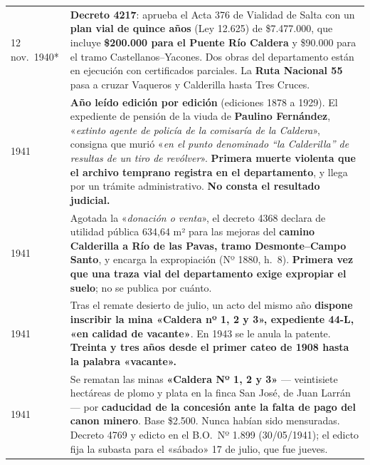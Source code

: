 \begin{longtable}{@{}p{2.7cm}p{10.3cm}@{}}
12 nov.\ 1940* & \textbf{Decreto 4217}: aprueba el Acta 376 de Vialidad de Salta con un \textbf{plan vial de quince años} (Ley 12.625) de \$7.477.000, que incluye \textbf{\$200.000 para el Puente Río Caldera} y \$90.000 para el tramo Castellanos--Yacones. Dos obras del departamento están en ejecución con certificados parciales. La \textbf{Ruta Nacional 55} pasa a cruzar Vaqueros y Calderilla hasta Tres Cruces. \\
1941 & \textbf{Año leído edición por edición} (ediciones 1878 a 1929). El expediente de pensión de la viuda de \textbf{Paulino Fernández}, «\textit{extinto agente de policía de la comisaría de la Caldera}», consigna que murió «\textit{en el punto denominado “la Calderilla” de resultas de un tiro de revólver}». \textbf{Primera muerte violenta que el archivo temprano registra en el departamento}, y llega por un trámite administrativo. \textbf{No consta el resultado judicial.} \\
1941 & Agotada la «\textit{donación o venta}», el decreto 4368 declara de utilidad pública 634,64 m² para las mejoras del \textbf{camino Calderilla a Río de las Pavas, tramo Desmonte--Campo Santo}, y encarga la expropiación (Nº 1880, h.\ 8). \textbf{Primera vez que una traza vial del departamento exige expropiar el suelo}; no se publica por cuánto. \\
1941 & Tras el remate desierto de julio, un acto del mismo año \textbf{dispone inscribir la mina «Caldera nº 1, 2 y 3», expediente 44-L, «en calidad de vacante»}. En 1943 se le anula la patente. \textbf{Treinta y tres años desde el primer cateo de 1908 hasta la palabra «vacante».} \\
1941 & Se rematan las minas \textbf{«Caldera Nº 1, 2 y 3»} --- veintisiete hectáreas de plomo y plata en la finca San José, de Juan Larrán --- por \textbf{caducidad de la concesión ante la falta de pago del canon minero}. Base \$2.500. Nunca habían sido mensuradas. Decreto 4769 y edicto en el B.O.\ Nº 1.899 (30/05/1941); el edicto fija la subasta para el «sábado» 17 de julio, que fue jueves. \\

\end{longtable}
